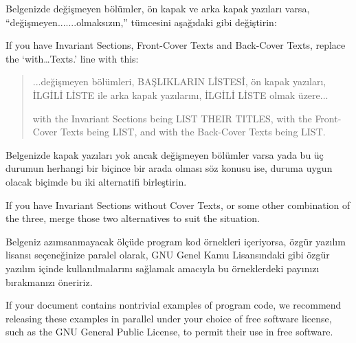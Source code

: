 \begin{multicols}{2}
\begin{quotation}
\par\endgroup\smallskip\footnotesize\noindent \end{quotation}

Belgenizde değişmeyen bölümler, ön kapak ve arka kapak yazıları varsa, “değişmeyen.......olmaksızın,” tümcesini aşağıdaki gibi değiştirin:
\begin{ingliz}If you have Invariant Sections, Front-Cover Texts and
Back-Cover Texts, replace the
`with\dots Texts.' line with this:\end{ingliz}

\begin{quotation}\small\begingroup 

...değişmeyen bölümleri, BAŞLIKLARIN LİSTESİ, ön kapak yazıları, İLGİLİ LİSTE ile arka kapak yazılarını, İLGİLİ LİSTE olmak üzere...
\begin{ingliz}with the Invariant Sections being LIST THEIR TITLES, with
the Front-Cover Texts being LIST, and with the Back-Cover
Texts being LIST.
\end{ingliz}

\par\endgroup\smallskip\footnotesize\noindent
\end{quotation}

Belgenizde kapak yazıları yok ancak değişmeyen bölümler varsa yada bu üç durumun herhangi bir biçince bir arada olması söz konusu ise, duruma uygun olacak biçimde bu iki alternatifi birleştirin.
\begin{ingliz}If you have Invariant Sections without Cover Texts, or
some other combination of the three, merge those two
alternatives to suit the situation.
\end{ingliz}

Belgeniz azımsanmayacak ölçüde program kod örnekleri içeriyorsa, özgür yazılım lisansı seçeneğinize paralel olarak, GNU Genel Kamu Lisansındaki gibi özgür yazılım içinde kullanılmalarını sağlamak amacıyla bu örneklerdeki payınızı bırakmanızı öneririz.
\begin{ingliz}If your document contains nontrivial examples of program
code, we recommend releasing these examples in parallel under
your choice of free software license, such as the GNU General
Public License, to permit their use in free software.\end{ingliz}

\end{multicols}
